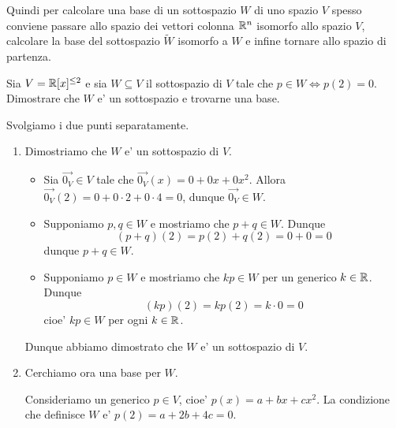 Quindi per calcolare una base di un sottospazio $W$ di uno spazio $V$ spesso conviene passare allo spazio dei vettori colonna $\mathbb{R}^n$ isomorfo allo spazio $V$, calcolare la base del sottospazio $\tilde{W}$ isomorfo a $W$ e infine tornare allo spazio di partenza.

\begin{example}
    Sia $V = \mathbb{R}[x]^{\leq 2}$ e sia $W \subseteq V$ il sottospazio di $V$ tale che $p \in W \iff p(2) = 0$. Dimostrare che $W$ e' un sottospazio e trovarne una base.
\end{example}
\begin{solution}
    Svolgiamo i due punti separatamente.
    \begin{enumerate}
        \item Dimostriamo che $W$ e' un sottospazio di $V$.
        \begin{itemize}
            \item Sia $\vec{0_V} \in V$ tale che $\vec{0_V}(x) = 0 + 0x + 0x^2$. Allora $\vec{0_V}(2) = 0 + 0\cdot 2 + 0 \cdot 4 = 0$, dunque $\vec{0_V} \in W$.
            \item Supponiamo $p, q \in W$ e mostriamo che $p+q \in W$. Dunque \[
                (p+q)(2) = p(2) + q(2) = 0 + 0 = 0    
            \] dunque $p + q \in W$.
            \item Supponiamo $p \in W$ e mostriamo che $kp \in W$ per un generico $k \in \mathbb{R}$. Dunque \[
                (kp)(2) = kp(2) = k \cdot 0 = 0    
            \] cioe' $kp \in W$ per ogni $k \in \mathbb{R}$.
        \end{itemize} 
        Dunque abbiamo dimostrato che $W$ e' un sottospazio di $V$.
        \item Cerchiamo ora una base per $W$.
         
        Consideriamo un generico $p \in V$, cioe' $p(x) = a + bx + cx^2$. La condizione che definisce $W$ e' $p(2) = a + 2b + 4c = 0$. 
    

\end{enumerate}
\end{solution}
